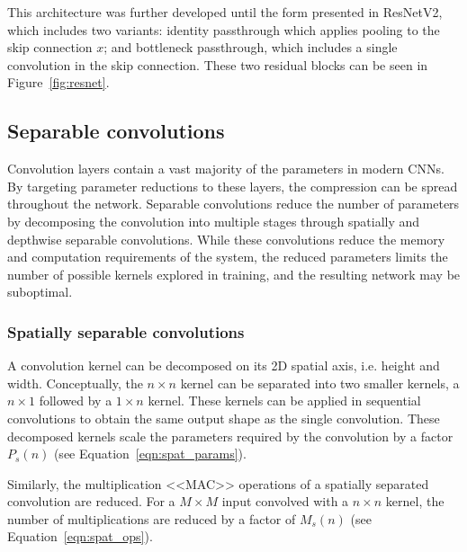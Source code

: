\documentclass{article}
\begin{document}
	This architecture was further developed until the form presented in ResNetV2, which includes two variants: identity passthrough which applies pooling to the skip connection $x$; and bottleneck passthrough, which includes a single convolution in the skip connection. These two residual blocks can be seen in Figure~\ref{fig:resnet}.
	
	\subsection{Separable convolutions}
	
	Convolution layers contain a vast majority of the parameters in modern CNNs. By targeting parameter reductions to these layers, the compression can be spread throughout the network. Separable convolutions reduce the number of parameters by decomposing the convolution into multiple stages through spatially and depthwise separable convolutions. While these convolutions reduce the memory and computation requirements of the system, the reduced parameters limits the number of possible kernels explored in training, and the resulting network may be suboptimal.
	
	\subsubsection{Spatially separable convolutions}
	
	
	A convolution kernel can be decomposed on its 2D spatial axis, i.e. height and width. Conceptually, the $n \times n$ kernel can be separated into two smaller kernels, a $n \times 1$ followed by a $1 \times n$ kernel. These kernels can be applied in sequential convolutions to obtain the same output shape as the single convolution. These decomposed kernels scale the parameters required by the convolution by a factor $P_s(n)$ (see Equation~\ref{eqn:spat_params}). 
	
	Similarly, the multiplication <<MAC>> operations of a spatially separated convolution are reduced. For a $M \times M$ input convolved with a $n \times n$ kernel, the number of multiplications are reduced by a factor of $M_s(n)$ (see Equation~\ref{eqn:spat_ops}). 
	
\end{document}
